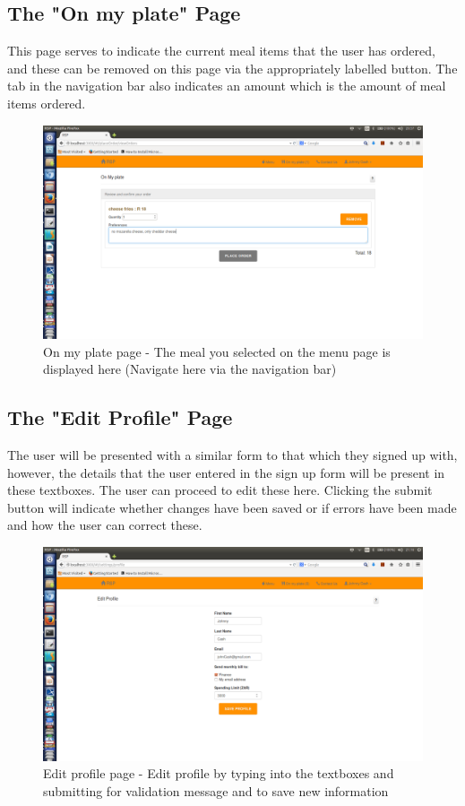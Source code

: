 \documentclass[a4paper,12pt]{article}
\begin{document}
\subsection{The "On my plate" Page} 
This page serves to indicate the current meal items that the user has ordered, and these can be removed on this page via the appropriately labelled button. The tab in the navigation bar also indicates an amount which is the amount of meal items ordered.

\begin{figure}[H]
  \centering
    \includegraphics[width=1.0\textwidth]{screenshots/addedOnPlate.png}
    \caption{On my plate page - The meal you selected on the menu page is displayed here (Navigate here via the navigation bar)} 
\end{figure}

\subsection{The "Edit Profile" Page} 
The user will be presented with a similar form to that which they signed up with, however, the details that the user entered in the sign up form will be present in these textboxes. The user can proceed to edit these here. Clicking the submit button will indicate whether changes have been saved or if errors have been made and how the user can correct these.

\begin{figure}[H]
  \centering
    \includegraphics[width=1.0\textwidth]{screenshots/editProfile.png}
    \caption{Edit profile page - Edit profile by typing into the textboxes and submitting for validation message and to save new information } 
\end{figure}
\end{document}

